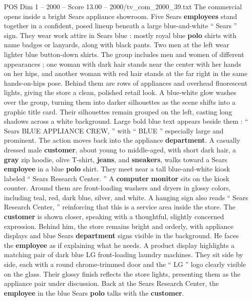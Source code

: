 \begin{textsample}{POS Dim 1 – 2000 – Score 13.00 – 2000/tv\_com\_2000\_39.txt}  \label{ex:f1_pos_036}
The commercial opens inside a bright Sears appliance showroom.
Five Sears \textbf{employees} stand together in a confident, posed lineup beneath a large blue-and-white “ Sears ” sign.
They wear work attire in Sears blue : mostly royal blue \textbf{polo} shirts with name badges or lanyards, along with black pants.
Two men at the left wear lighter blue button-down shirts.
The group includes men and women of different appearances ; one woman with dark hair stands near the center with her hands on her hips, and another woman with red hair stands at the far right in the same hands-on-hips pose.
Behind them are rows of appliances and overhead fluorescent lights, giving the store a clean, polished retail look.
A blue-white glow washes over the group, turning them into darker silhouettes as the scene shifts into a graphic title card.
Their silhouettes remain grouped on the left, casting long shadows across a white background.
Large bold blue text appears beside them : “ Sears BLUE APPLIANCE CREW, ” with “ BLUE ” especially large and prominent.
The action moves back into the appliance \textbf{department}.
A casually dressed male \textbf{customer}, about young to middle-aged, with short dark hair, a \textbf{gray} zip hoodie, olive T-shirt, \textbf{jeans}, and \textbf{sneakers}, walks toward a Sears \textbf{employee} in a blue \textbf{polo} shirt.
They meet near a tall blue-and-white kiosk labeled “ Sears Research Center. ” A \textbf{computer} \textbf{monitor} sits on the kiosk counter.
Around them are front-loading washers and dryers in glossy colors, including teal, red, dark blue, silver, and white.
A hanging sign also reads “ Sears Research Center, ” reinforcing that this is a service area inside the store.
The \textbf{customer} is shown closer, speaking with a thoughtful, slightly concerned expression.
Behind him, the store remains bright and orderly, with appliance displays and blue Sears \textbf{department} signs visible in the background.
He faces the \textbf{employee} as if explaining what he needs.
A product display highlights a matching pair of dark blue LG front-loading laundry machines.
They sit side by side, each with a round chrome-trimmed door and the “ LG ” logo clearly visible on the glass.
Their glossy finish reflects the store lights, presenting them as the appliance pair under discussion.
Back at the Sears Research Center, the \textbf{employee} in the blue Sears \textbf{polo} talks with the \textbf{customer}.

\end{textsample}
